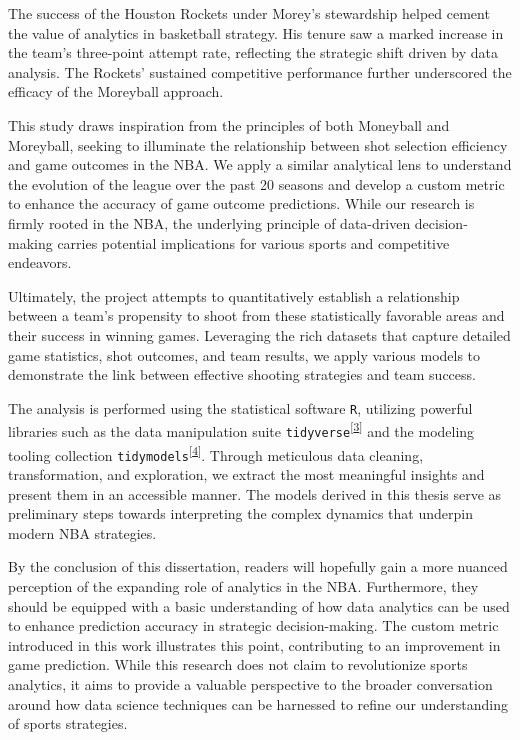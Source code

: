 \documentclass[
  12pt,
  a4paper,
]{article}
\begin{document}
The success of the Houston Rockets under Morey's stewardship helped cement the value of analytics in basketball strategy. His tenure saw a marked increase in the team's three-point attempt rate, reflecting the strategic shift driven by data analysis. The Rockets' sustained competitive performance further underscored the efficacy of the Moreyball approach.

This study draws inspiration from the principles of both Moneyball and Moreyball, seeking to illuminate the relationship between shot selection efficiency and game outcomes in the NBA. We apply a similar analytical lens to understand the evolution of the league over the past 20 seasons and develop a custom metric to enhance the accuracy of game outcome predictions. While our research is firmly rooted in the NBA, the underlying principle of data-driven decision-making carries potential implications for various sports and competitive endeavors.

Ultimately, the project attempts to quantitatively establish a relationship between a team's propensity to shoot from these statistically favorable areas and their success in winning games. Leveraging the rich datasets that capture detailed game statistics, shot outcomes, and team results, we apply various models to demonstrate the link between effective shooting strategies and team success.

The analysis is performed using the statistical software \texttt{R}, utilizing powerful libraries such as the data manipulation suite \texttt{tidyverse}\textsuperscript{{[}\protect\hyperlink{ref-RTidyverse}{3}{]}} and the modeling tooling collection \texttt{tidymodels}\textsuperscript{{[}\protect\hyperlink{ref-RTidymodels}{4}{]}}. Through meticulous data cleaning, transformation, and exploration, we extract the most meaningful insights and present them in an accessible manner. The models derived in this thesis serve as preliminary steps towards interpreting the complex dynamics that underpin modern NBA strategies.

By the conclusion of this dissertation, readers will hopefully gain a more nuanced perception of the expanding role of analytics in the NBA. Furthermore, they should be equipped with a basic understanding of how data analytics can be used to enhance prediction accuracy in strategic decision-making. The custom metric introduced in this work illustrates this point, contributing to an improvement in game prediction. While this research does not claim to revolutionize sports analytics, it aims to provide a valuable perspective to the broader conversation around how data science techniques can be harnessed to refine our understanding of sports strategies.
\end{document}
